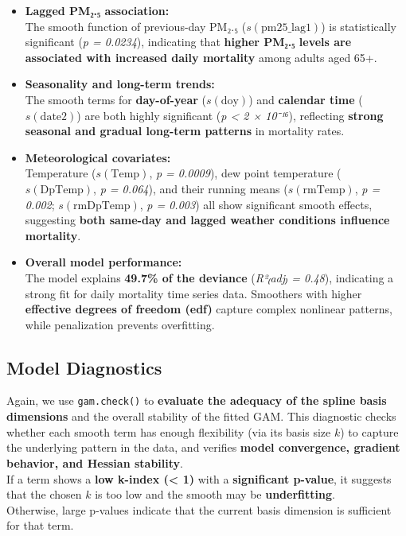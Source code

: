 \documentclass[
  letterpaper,
  DIV=11,
  numbers=noendperiod]{scrreprt}
\begin{document}
\begin{itemize}
\item
  \textbf{Lagged PM₂.₅ association:}\\
  The smooth function of previous-day PM₂.₅ (\(s(\text{pm25\_lag1})\))
  is statistically significant (\emph{p = 0.0234}), indicating that
  \textbf{higher PM₂.₅ levels are associated with increased daily
  mortality} among adults aged 65+.
\item
  \textbf{Seasonality and long-term trends:}\\
  The smooth terms for \textbf{day-of-year} (\(s(\text{doy})\)) and
  \textbf{calendar time} (\(s(\text{date2})\)) are both highly
  significant (\emph{p \textless{} 2 × 10⁻¹⁶}), reflecting
  \textbf{strong seasonal and gradual long-term patterns} in mortality
  rates.
\item
  \textbf{Meteorological covariates:}\\
  Temperature (\(s(\text{Temp})\), \emph{p = 0.0009}), dew point
  temperature (\(s(\text{DpTemp})\), \emph{p = 0.064}), and their
  running means (\(s(\text{rmTemp})\), \emph{p = 0.002};
  \(s(\text{rmDpTemp})\), \emph{p = 0.003}) all show significant smooth
  effects, suggesting \textbf{both same-day and lagged weather
  conditions influence mortality}.
\item
  \textbf{Overall model performance:}\\
  The model explains \textbf{49.7\% of the deviance} (\emph{R²₍adj₎ =
  0.48}), indicating a strong fit for daily mortality time series data.
  Smoothers with higher \textbf{effective degrees of freedom (edf)}
  capture complex nonlinear patterns, while penalization prevents
  overfitting.
\end{itemize}

\hypertarget{model-diagnostics-1}{%
\subsection*{Model Diagnostics}\label{model-diagnostics-1}}

Again, we use \texttt{gam.check()} to \textbf{evaluate the adequacy of
the spline basis dimensions} and the overall stability of the fitted
GAM. This diagnostic checks whether each smooth term has enough
flexibility (via its basis size \(k\)) to capture the underlying pattern
in the data, and verifies \textbf{model convergence, gradient behavior,
and Hessian stability}.\\
If a term shows a \textbf{low k-index (\textless{} 1)} with a
\textbf{significant p-value}, it suggests that the chosen \(k\) is too
low and the smooth may be \textbf{underfitting}.\\
Otherwise, large p-values indicate that the current basis dimension is
sufficient for that term.
\end{document}
